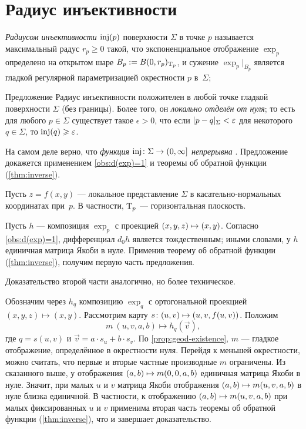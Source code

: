 \section{Радиус инъективности}

\emph{Радиусом инъективности} $\mathop{\rm inj}\nolimits(p)$ поверхности $\Sigma$ в точке $p$ называется максимальный радус $r_p\ge 0$ такой, что экспоненциальное отображение $\exp_p$ определено на открытом шаре $B_p\z\df B(0,r_p)_{\T_p}$,
и сужение $\exp_p|_{B_p}$ является гладкой регулярной параметризацией окрестности $p$ в~$\Sigma$;


\begin{thm}{Предложение}\label{prop:exp}
Радиус инъективности положителен в любой точке гладкой поверхности $\Sigma$ (без границы).
Более того, он {}\emph{локально отделён от нуля};
то есть для любого $p\in \Sigma$ существует такое $\epsilon>0$, что если $\dist{p}{q}\Sigma<\epsilon$ для некоторого $q\in \Sigma$, то $\mathop{\rm inj}\nolimits(q)\geqslant\varepsilon$.
\end{thm}

На самом деле верно, что \textit{функция $\inj\:\Sigma\z\to (0,\infty]$ непрерывна} \cite[5.4]{gromoll-klingenberg-meyer}.
Предложение докажется применением \ref{obs:d(exp)=1} и теоремы об обратной функции (\ref{thm:inverse}).

Пусть $z=f(x,y)$ --- локальное представление $\Sigma$ в касательно-нормальных координатах при~$p$.
В частности, $\mathrm{T}_p$ --- горизонтальная плоскость.

Пусть $h$ --- композиция $\exp_p$ с проекцией $(x,y,z)\z\mapsto (x,y)$.
Согласно \ref{obs:d(exp)=1}, дифференциал $d_0h$ является тождественным;
иными словами, у $h$ единичная матрица Якоби в нуле.
Применив теорему об обратной функции (\ref{thm:inverse}), получим первую часть предложения.

Доказательство второй части аналогично, но более техническое.

Обозначим через $h_q$ композицию $\exp_q$ с ортогональной проекцией $(x,y,z)\mapsto (x,y)$.
Рассмотрим карту $s\:(u,v)\z\mapsto (u,v,f(u,v))$.
Положим 
\[m\:(u,v,a,b)\mapsto h_q(\vec v),\]
где $q=s(u,v)$ и $\vec v=a\cdot s_u+b\cdot s_v$.
По \ref{prop:geod-existence}, $m$ --- гладкое отображение, определённое в окрестности нуля.
Перейдя к меньшей окрестности, можно считать, что первые и вторые частные производные $m$ ограничены.
Из сказанного выше, у отображения $(a,b)\z\mapsto m(0,0,a,b)$ единичная матрица Якоби в нуле.
Значит, при малых $u$ и $v$ матрица Якоби отображения $(a,b)\z\mapsto m(u,v,a,b)$ в нуле близка единичной.
В частности, к отображению $(a,b)\z\mapsto m(u,v,a,b)$ при малых фиксированных $u$ и $v$
применима вторая часть теоремы об обратной функции (\ref{thm:inverse}), что и завершает доказательство.
\qeds

